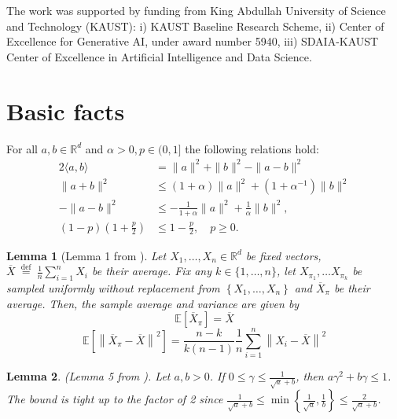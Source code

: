 \documentclass{article}
\newtheorem{lemma}{Lemma}
\theoremstyle{plain}
\theoremstyle{plain}
\theoremstyle{definition}
\theoremstyle{remark}
\begin{document}
The work was supported by funding from King Abdullah University of Science and Technology (KAUST): i) KAUST Baseline Research Scheme, ii) Center of Excellence for Generative AI, under award number 5940, iii) SDAIA-KAUST Center of Excellence in Artificial Intelligence and Data Science.






\clearpage
\appendix
\tableofcontents

\clearpage
\section{Basic facts}
For all $a, b \in \mathbb{R}^d$ and $\alpha>0, p \in(0,1]$ the following relations hold:
\begin{align}
\label{eq:quadratic} 2\langle a, b\rangle & =\|a\|^2+\|b\|^2-\|a-b\|^2 \\
\label{eq:yung-1}\|a+b\|^2 & \leq(1+\alpha)\|a\|^2+\left(1+\alpha^{-1}\right)\|b\|^2 \\
\label{eq:yung-2}-\|a-b\|^2 & \leq-\frac{1}{1+\alpha}\|a\|^2+\frac{1}{\alpha}\|b\|^2, \\
\label{eq:contract}(1-p)\left(1+\frac{p}{2}\right) & \leq 1-\frac{p}{2}, \quad p\geq 0 .
\end{align}



\begin{lemma}[Lemma 1 from \citep{mishchenko2020random}]
\label{lemma:RR}
     Let $X_1, \ldots, X_n \in \mathbb{R}^d$ be fixed vectors, $\overline{X} \stackrel{\text { def }}{=} \frac{1}{n} \sum_{i=1}^n X_i$ be their average. Fix any $k \in\{1, \ldots, n\}$, let $X_{\pi_1}, \ldots X_{\pi_k}$ be sampled uniformly without replacement from $\left\{X_1, \ldots, X_n\right\}$ and $\overline{X}_\pi$ be their average. Then, the sample average and variance are given by
$$
\mathbb{E}\left[\overline{X}_\pi\right]=\overline{X}
$$
$$
\mathbb{E}\left[\left\|\overline{X}_\pi-\overline{X}\right\|^2\right]=\frac{n-k}{k(n-1)} \frac{1}{n} \sum_{i=1}^n\left\|X_i-\overline{X}\right\|^2
$$
\end{lemma}


\begin{lemma} (Lemma 5 from \citep{ef21}).
\label{lemma:peter}
Let $a, b>0$. If $0 \leq \gamma \leq \frac{1}{\sqrt{a}+b}$, then $a \gamma^2+b \gamma \leq 1$. The bound is tight up to the factor of 2 since $\frac{1}{\sqrt{a}+b} \leq \min \left\{\frac{1}{\sqrt{a}}, \frac{1}{b}\right\} \leq \frac{2}{\sqrt{a}+b}$.
\end{lemma}
\end{document}
